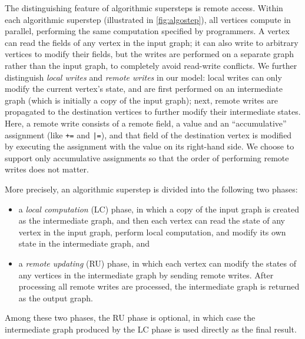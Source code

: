 \documentclass{sokendai_thesis} %
\begin{document}
The distinguishing feature of algorithmic supersteps is remote access.
Within each algorithmic superstep (illustrated in \autoref{fig:algostep}), all vertices compute in parallel, performing the same computation specified by programmers.
A vertex can read the fields of any vertex in the input graph; it can also write to arbitrary vertices to modify their fields, but the writes are performed on a separate graph rather than the input graph, to completely avoid read-write conflicts.
We further distinguish \emph{local writes} and \emph{remote writes} in our model:
local writes can only modify the current vertex's state, and are first performed on an intermediate graph (which is initially a copy of the input graph);
next, remote writes are propagated to the destination vertices to further modify their intermediate states.
Here, a remote write consists of a remote field, a value and an ``accumulative'' assignment (like \texttt{+=} and \texttt{|=}), and that field of the destination vertex is modified by executing the assignment with the value on its right-hand side.
We choose to support only accumulative assignments so that the order of performing remote writes does not matter.

More precisely, an algorithmic superstep is divided into the following two phases:
\begin{itemize}
 \item a \emph{local computation} (LC) phase, in which a copy of the input graph is created as the intermediate graph, and then each vertex can read the state of any vertex in the input graph, perform local computation, and modify its own state in the intermediate graph, and
 \item a \emph{remote updating} (RU) phase, in which each vertex can modify the states of any vertices in the intermediate graph by sending remote writes.
After processing all remote writes are processed, the intermediate graph is returned as the output graph.
\end{itemize}
Among these two phases, the RU phase is optional, in which case the intermediate graph produced by the LC phase is used directly as the final result.
\end{document}
